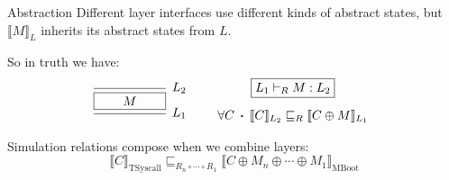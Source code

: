 \documentclass{beamer}
\newcommand{\kw}[1]{\ensuremath{ \mathrm{#1} }}
\newcommand{\bdot}{\boldsymbol{\cdot}}
\begin{document}

\begin{frame}{Abstraction} %
  Different layer interfaces use different kinds of abstract states,
  but $\llbracket M \rrbracket_L$ inherits its abstract states from $L$.

  \pause
  So in truth we have:
  \[
    \begin{prooftree}
      \infer0[$L_2$]{\fbox{$\qquad M \qquad$}}
      \infer1[$L_1$]{}
    \end{prooftree}
    \qquad
    \begin{array}{c}
      \fbox{$L_1 \vdash_R M : L_2$} \\[1em]
      \forall C \: \bdot \:
      \llbracket C \rrbracket_{L_2} \sqsubseteq_R
      \llbracket C \oplus M \rrbracket_{L_1}
    \end{array}
  \]

  \pause
  Simulation relations compose when we combine layers:
  \[
    \llbracket C \rrbracket_\kw{TSyscall}
    \sqsubseteq_{R_n \circ \cdots \circ R_1}
    \llbracket C \oplus M_n \oplus \cdots \oplus M_1 \rrbracket_\kw{MBoot}
  \]
\end{frame}
\end{document}

